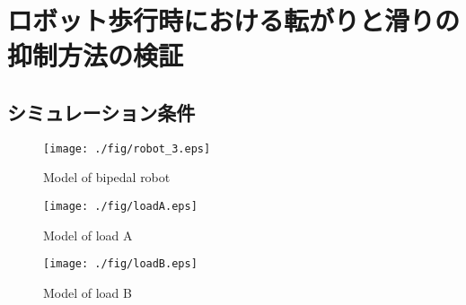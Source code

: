 \section{ロボット歩行時における転がりと滑りの抑制方法の検証}
\subsection{シミュレーション条件}
\begin{figure}[t]
    \begin{center}
    \texttt{[image: ./fig/robot\_3.eps]}
    \caption{Model of bipedal robot}
  \end{center}
\end{figure}

\begin{figure}[t]
    \begin{minipage}[b]{0.45\linewidth}
      \centering
      \texttt{[image: ./fig/loadA.eps]}%
      \vspace*{-0.1cm}%
      \caption{Model of load A}
    \end{minipage}
    \begin{minipage}[b]{0.45\linewidth}
      \centering
      \texttt{[image: ./fig/loadB.eps]}%
      \caption{Model of load B}
    \end{minipage}
  \end{figure}

